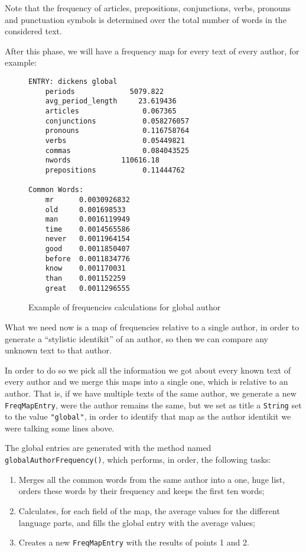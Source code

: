 \documentclass[a4paper,11pt, twoside]{article}
\begin{document}
		\noindent
		Note that the frequency of articles, prepositions, conjunctions, verbs, pronouns and punctuation symbols is determined over the total number of words in the considered text.
		
		\noindent
		After this phase, we will have a frequency map for every text of every author, for example:

	\begin{figure}[h!]
		\centering
		\begin{BVerbatim}[fontsize=\footnotesize]
ENTRY: dickens global
	periods             5079.822
	avg_period_length     23.619436
	articles               0.067365
	conjunctions           0.058276057
	pronouns               0.116758764
	verbs                  0.05449821
	commas                 0.084043525
	nwords            110616.18
	prepositions           0.11444762

Common Words:
	mr      0.0030926832
	old     0.001698533
	man     0.0016119949
	time    0.0014565586
	never   0.0011964154
	good    0.0011850407
	before  0.0011834776
	know    0.001170031
	than    0.001152259
	great   0.0011296555
	\end{BVerbatim}
	\caption{Example of frequencies calculations for global author}
	\label{fig:freq-auth}
\end{figure}

		\noindent
		What we need now is a map of frequencies relative to a single author, in order to generate a ``stylistic identikit''  of an author, so then we can compare any unknown text to that author.

		\noindent
		In order to do so we pick all the information we got about every known text of every author and we merge this maps into a single one, which is relative to an author. That is, if we have multiple texts of the same author, we generate a new \lstinline|FreqMapEntry|, were the author remains the same, but we set as title a \lstinline|String| set to the value \lstinline|"global"|, in order to identify that map as the author identikit we were talking some lines above.

		\bigskip
		\noindent
		The global entries are generated with the method named \lstinline|globalAuthorFrequency()|, which performs, in order, the following tasks: \begin{enumerate}
		\item Merges all the common words from the same author into a one, huge list, orders these words by their frequency and keeps the first ten words;
		\item Calculates, for each field of the map, the average values for the different language parts, and fills the global entry with the average values;
		\item Creates a new \lstinline|FreqMapEntry| with the results of points 1 and 2.
		\end{enumerate}
\end{document}
